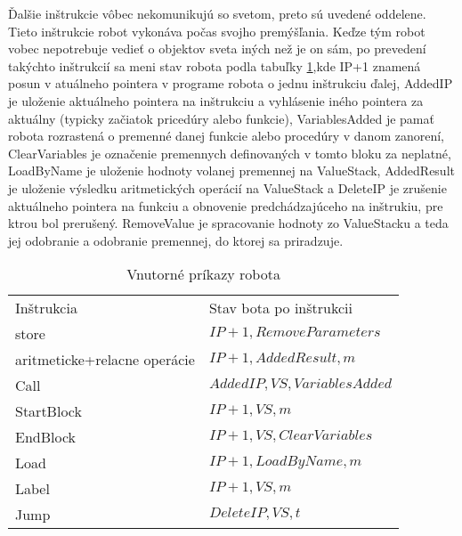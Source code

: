 Ďalšie inštrukcie vôbec nekomunikujú so svetom, preto sú uvedené oddelene. Tieto inštrukcie robot vykonáva počas svojho premýšľania. Keďze tým robot vobec nepotrebuje vedieť o objektov sveta iných než je on sám, po prevedení takýchto inštrukcií sa meni stav robota podla tabuľky \ref{VnutroBota},kde IP+1 znamená posun v atuálneho pointera v programe robota o jednu inštrukciu ďalej, AddedIP je uloženie aktuálneho pointera na inštrukciu a vyhlásenie iného pointera za aktuálny (typicky začiatok pricedúry alebo funkcie), VariablesAdded je pamať robota rozrastená o premenné danej funkcie alebo procedúry v danom zanorení, ClearVariables je označenie premennych definovaných v tomto bloku za neplatné, LoadByName je uloženie hodnoty volanej premennej na ValueStack, AddedResult je uloženie výsledku aritmetických operácií na ValueStack a DeleteIP je zrušenie aktuálneho pointera na funkciu a obnovenie predchádzajúceho na inštrukiu, pre ktrou bol prerušený. RemoveValue je spracovanie hodnoty zo ValueStacku a teda jej odobranie a odobranie premennej, do ktorej sa priradzuje.

\begin{table}[ht]
\centering
\caption{Vnutorné príkazy robota}
\begin{tabular}{|l|p{5cm}|}
\hline\hline
Inštrukcia & Stav bota po inštrukcii \\
store & $ IP+1,RemoveParameters$\\
aritmeticke+relacne operácie & $IP+1,AddedResult,m$ \\
Call &  $ AddedIP,VS,VariablesAdded$\\
StartBlock & $IP+1,VS,m$\\
EndBlock & $IP+1,VS,ClearVariables$\\
Load & $ IP+1,LoadByName,m$\\
Label & $ IP+1,VS,m$\\
Jump & $ DeleteIP,VS,t$\\
\hline
\end{tabular}
\label{VnutroBota}
\end{table}

